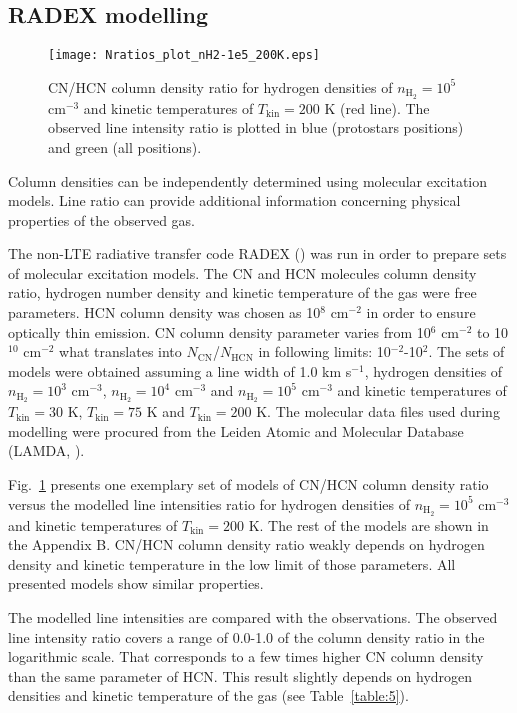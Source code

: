 \documentclass{aa}
\begin{document}
\subsection{RADEX modelling}

\begin{figure}
   \centering
   \texttt{[image: Nratios\_plot\_nH2-1e5\_200K.eps]}
      \caption{CN/HCN column density ratio for hydrogen densities of $n_\mathrm{H_2} = 10^5$ cm$^{-3}$ and kinetic temperatures of $T_\mathrm{kin} = 200$ K (red line). The observed line intensity ratio is plotted in blue (protostars positions) and green (all positions).}
         \label{1e5_75K}
   \end{figure}

Column densities can be independently determined using molecular excitation models. Line ratio can provide additional information concerning physical properties of the observed gas. 

The non-LTE radiative transfer code RADEX (\cite{vdT07}) was run in order to prepare sets of molecular excitation models. The CN and HCN molecules column density ratio, hydrogen number density and kinetic temperature of the gas were free parameters. HCN column density was chosen as 10$^8$ cm$^{-2}$ in order to ensure optically thin emission. CN column density parameter varies from 10$^6$ cm$^{-2}$ to 10$^{10}$ cm$^{-2}$ what translates into $N_\mathrm{CN}$/$N_\mathrm{HCN}$ in following limits: 10$^{-2}$-10$^{2}$. The sets of models were obtained assuming a line width of 1.0 km s$^{-1}$, hydrogen densities of $n_\mathrm{H_2} = 10^3$ cm$^{-3}$, $n_\mathrm{H_2} = 10^4$ cm$^{-3}$ and $n_\mathrm{H_2} = 10^5$ cm$^{-3}$ and kinetic temperatures of $T_\mathrm{kin} = 30$ K, $T_\mathrm{kin} = 75$ K and $T_\mathrm{kin} =200$ K. The molecular data files used during modelling were procured from the Leiden Atomic and Molecular Database (LAMDA, \cite{Sch05}).

Fig.~\ref{1e5_75K} presents one exemplary set of models of CN/HCN column density ratio versus the modelled line intensities ratio for hydrogen densities of $n_\mathrm{H_2} = 10^5$ cm$^{-3}$ and kinetic temperatures of $T_\mathrm{kin} = 200$ K. The rest of the models are shown in the Appendix B. CN/HCN column density ratio weakly depends on hydrogen density and kinetic temperature in the low limit of those parameters. All presented models show similar properties.

The modelled line intensities are compared with the observations. The observed line intensity ratio covers a range of \mbox{0.0-1.0} of the column density ratio in the logarithmic scale. That corresponds to a few times higher CN column density than the same parameter of HCN. This result slightly depends on hydrogen densities and kinetic temperature of the gas (see Table~\ref{table:5}).
\end{document}
